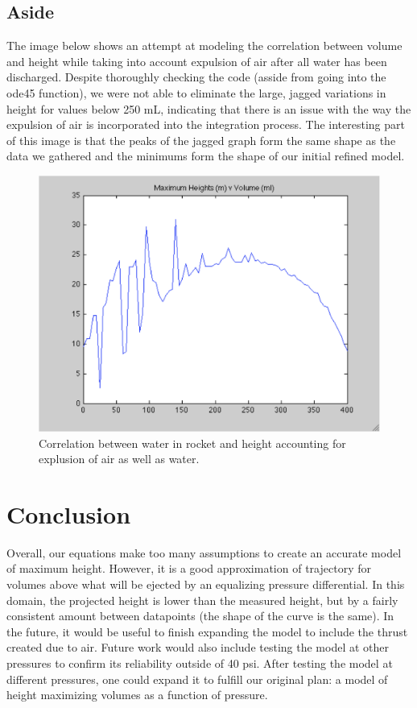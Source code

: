 \documentclass[12pt]{article}
\begin{document}
  \subsection{Aside}
   The image below shows an attempt at modeling the correlation between volume and height while taking into account expulsion of air after all water has been discharged. Despite thoroughly checking the code (asside from going into the ode45 function), we were not able to eliminate the large, jagged variations in height for values below 250 mL, indicating that there is an issue with the way the expulsion of air is incorporated into the integration process. The interesting part of this image is that the peaks of the jagged graph form the same shape as the data we gathered and the minimums form the shape of our initial refined model.
  
    \begin{figure}[H]
    \includegraphics[scale=.3]{compressibleBernoulli.png}
    \centering
    \caption{Correlation between water in rocket and height accounting for explusion of air as well as water.}
    \end{figure}
  
  \section{Conclusion}
  
  Overall, our equations make too many assumptions to create an accurate model of maximum height. However, it is a good approximation of trajectory for volumes above what will be ejected by an equalizing pressure differential. In this domain, the projected height is lower than the measured height, but by a fairly consistent amount between datapoints (the shape of the curve is the same). In the future, it would be useful to finish expanding the model to include the thrust created due to air. Future work would also include testing the model at other pressures to confirm its reliability outside of 40 psi. After testing the model at different pressures, one could expand it to fulfill our original plan: a model of height maximizing volumes as a function of pressure.
  
\end{document}
